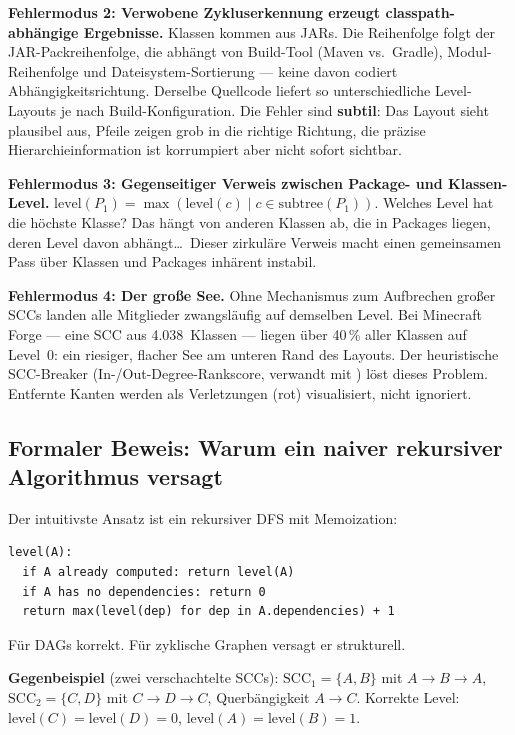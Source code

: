 \documentclass[a4paper,twoside]{article}
\begin{document}
\textbf{Fehlermodus 2: Verwobene Zykluserkennung erzeugt classpath-abh\"{a}ngige
Ergebnisse.}
Klassen kommen aus JARs. Die Reihenfolge folgt der JAR-Packreihenfolge, die
abh\"{a}ngt von Build-Tool (Maven vs.\ Gradle), Modul-Reihenfolge und
Dateisystem-Sortierung --- keine davon codiert Abh\"{a}ngigkeitsrichtung.
Derselbe Quellcode liefert so unterschiedliche Level-Layouts je nach
Build-Konfiguration. Die Fehler sind \textbf{subtil}: Das Layout sieht plausibel aus,
Pfeile zeigen grob in die richtige Richtung, die pr\"{a}zise Hierarchieinformation
ist korrumpiert aber nicht sofort sichtbar.

\textbf{Fehlermodus 3: Gegenseitiger Verweis zwischen Package- und Klassen-Level.}
$\text{level}(P_1) = \max(\text{level}(c) \mid c \in \text{subtree}(P_1))$.
Welches Level hat die h\"{o}chste Klasse? Das h\"{a}ngt von anderen Klassen ab,
die in Packages liegen, deren Level davon abh\"{a}ngt\ldots\ Dieser zirkul\"{a}re
Verweis macht einen gemeinsamen Pass \"{u}ber Klassen und Packages inh\"{a}rent instabil.

\textbf{Fehlermodus 4: Der gro{\ss}e See.}
Ohne Mechanismus zum Aufbrechen gro{\ss}er SCCs landen alle Mitglieder
zwangsl\"{a}ufig auf demselben Level. Bei Minecraft Forge --- eine SCC aus
4.038~Klassen --- liegen \"{u}ber 40\,\% aller Klassen auf Level~0: ein riesiger,
flacher See am unteren Rand des Layouts. Der heuristische SCC-Breaker
(In-/Out-Degree-Rankscore, verwandt mit \cite{Eades1993}) l\"{o}st dieses Problem.
Entfernte Kanten werden als Verletzungen (rot) visualisiert, nicht ignoriert.

\subsection*{Formaler Beweis: Warum ein naiver rekursiver Algorithmus versagt}

Der intuitivste Ansatz ist ein rekursiver DFS mit Memoization:

\begin{verbatim}
level(A):
  if A already computed: return level(A)
  if A has no dependencies: return 0
  return max(level(dep) for dep in A.dependencies) + 1
\end{verbatim}

F\"{u}r DAGs korrekt. F\"{u}r zyklische Graphen versagt er strukturell.

\textbf{Gegenbeispiel} (zwei verschachtelte SCCs):
$\text{SCC}_1 = \{A,B\}$ mit $A \rightarrow B \rightarrow A$,
$\text{SCC}_2 = \{C,D\}$ mit $C \rightarrow D \rightarrow C$,
Querb\"{a}ngigkeit $A \rightarrow C$.
Korrekte Level: $\text{level}(C)=\text{level}(D)=0$, $\text{level}(A)=\text{level}(B)=1$.
\end{document}
